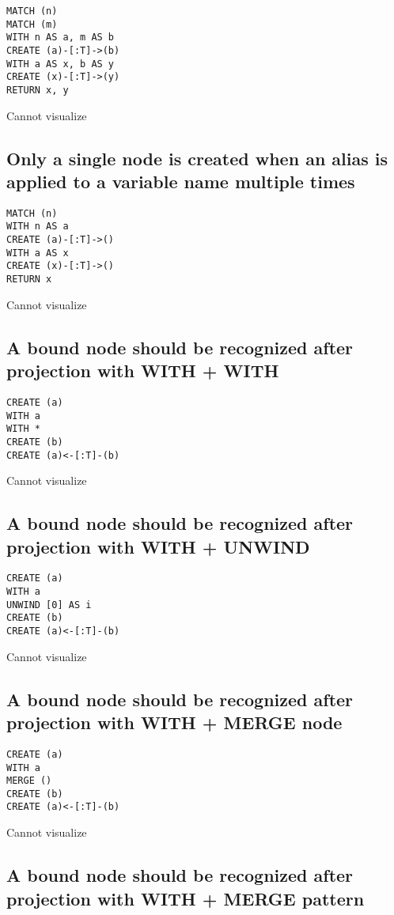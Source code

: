 \begin{lstlisting}
MATCH (n)
MATCH (m)
WITH n AS a, m AS b
CREATE (a)-[:T]->(b)
WITH a AS x, b AS y
CREATE (x)-[:T]->(y)
RETURN x, y
\end{lstlisting}

Cannot visualize
\subsection{Only a single node is created when an alias is applied to a variable name multiple times}

\begin{lstlisting}
MATCH (n)
WITH n AS a
CREATE (a)-[:T]->()
WITH a AS x
CREATE (x)-[:T]->()
RETURN x
\end{lstlisting}

Cannot visualize
\subsection{A bound node should be recognized after projection with WITH + WITH}

\begin{lstlisting}
CREATE (a)
WITH a
WITH *
CREATE (b)
CREATE (a)<-[:T]-(b)
\end{lstlisting}

Cannot visualize
\subsection{A bound node should be recognized after projection with WITH + UNWIND}

\begin{lstlisting}
CREATE (a)
WITH a
UNWIND [0] AS i
CREATE (b)
CREATE (a)<-[:T]-(b)
\end{lstlisting}

Cannot visualize
\subsection{A bound node should be recognized after projection with WITH + MERGE node}

\begin{lstlisting}
CREATE (a)
WITH a
MERGE ()
CREATE (b)
CREATE (a)<-[:T]-(b)
\end{lstlisting}

Cannot visualize
\subsection{A bound node should be recognized after projection with WITH + MERGE pattern}


